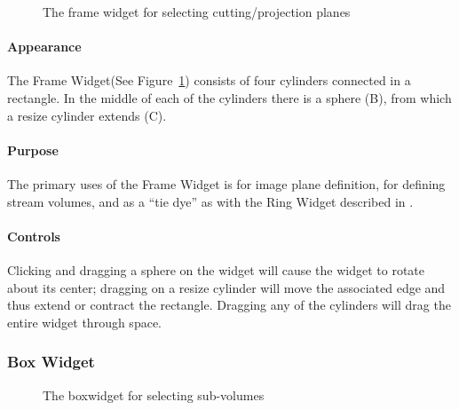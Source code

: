 \begin{figure}[htb]
  \begin{makeimage}
  \end{makeimage}
  \framewidget
  \caption{\label{fig:framewidget} The frame widget for selecting
    cutting/projection planes}
\end{figure}


\paragraph{Appearance} The
Frame Widget(See Figure~\ref{fig:framewidget}) consists of four cylinders connected in a rectangle.  In
the middle of each of the cylinders there is a sphere (B), from which
a resize cylinder extends (C).

\paragraph{Purpose} The primary uses of the Frame Widget is for image
plane definition, for defining stream volumes, and as a ``tie dye'' as with
the Ring Widget described in .

\paragraph{Controls} Clicking and dragging a sphere on the widget will
cause the widget to rotate about its center; dragging on a resize cylinder
will move the associated edge and thus extend or contract the rectangle.
Dragging any of the cylinders will drag the entire widget through space.


\subsubsection{Box Widget}
\label{sec:view-boxwidget} 

\begin{figure}[htb]
  \begin{makeimage}
  \end{makeimage}
  \boxwidget
  \caption{\label{fig:boxwidget} The boxwidget for selecting sub-volumes}
\end{figure}

